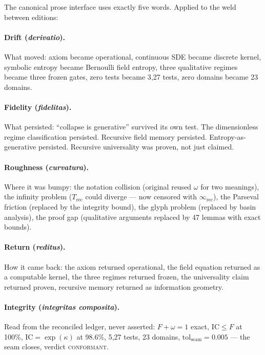 \documentclass[
  aps,
  prd,
  preprint,
  superscriptaddress,
  nofootinbib,
  floatfix,
  longbibliography
]{revtex4-2}
\newcommand{\tolseam}{\mathrm{tol}_{\mathrm{seam}}}
\newcommand{\regime}[1]{\textrm{\upshape\scshape#1}}
\newcommand{\conform}{\regime{conformant}}
\newcommand{\IC}{\mathrm{IC}}
\newcommand{\Fid}{F}
\newcommand{\Drft}{\omega}
\newcommand{\Logint}{\kappa}
\newcommand{\lat}[1]{\textit{#1}}
\begin{document}
The canonical prose interface uses exactly five words.
Applied to the weld between editions:

\paragraph{Drift (\lat{derivatio}).}
What moved: axiom became operational, continuous SDE became
discrete kernel, symbolic entropy became Bernoulli field
entropy, three qualitative regimes became three frozen
gates, zero tests became 3{,}27 tests, zero domains
became 23 domains.

\paragraph{Fidelity (\lat{fidelitas}).}
What persisted: ``collapse is generative'' survived
its own test. The dimensionless regime classification
persisted. Recursive field memory persisted.
Entropy-as-generative persisted. Recursive universality
was proven, not just claimed.

\paragraph{Roughness (\lat{curvatura}).}
Where it was bumpy: the notation collision
(original reused $\Drft$ for two meanings),
the infinity problem ($T_{\mathrm{rec}}$ could diverge —
now censored with $\infty_{\mathrm{rec}}$),
the Parseval friction (replaced by the integrity bound),
the glyph problem (replaced by basin analysis),
the proof gap (qualitative arguments replaced by
47 lemmas with exact bounds).

\paragraph{Return (\lat{reditus}).}
How it came back: the axiom returned operational,
the field equation returned as a computable kernel,
the three regimes returned frozen, the universality
claim returned proven, recursive memory returned as
information geometry.

\paragraph{Integrity (\lat{integritas composita}).}
Read from the reconciled ledger, never asserted:
$\Fid + \Drft = 1$ exact, $\IC \leq \Fid$ at 100\%,
$\IC = \exp(\Logint)$ at 98.6\%,
5{,}27 tests, 23 domains,
$\tolseam = 0.005$ — the seam closes,
verdict \conform{}.
\end{document}
